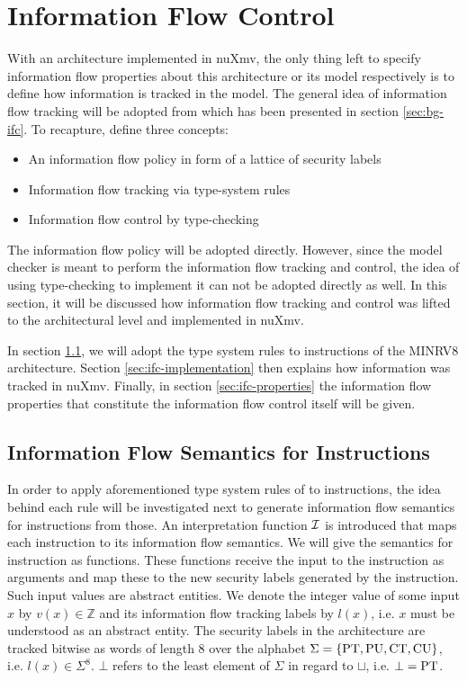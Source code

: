 
\chapter{Information Flow Control}
\label{chp:ifc}

With an architecture implemented in nuXmv, the only thing left to specify information flow properties about this architecture or its model respectively is to define how information is tracked in the model.
The general idea of information flow tracking will be adopted from \cite{Ferraiuolo17} which has been presented in section \ref{sec:bg-ifc}.
To recapture, \citeauthor{Ferraiuolo17} define three concepts:
\begin{itemize}
    \item An information flow policy in form of a lattice of security labels
    \item Information flow tracking via type-system rules
    \item Information flow control by type-checking
\end{itemize}

The information flow policy will be adopted directly.
However, since the model checker is meant to perform the information flow tracking and control, the idea of using type-checking to implement it can not be adopted directly as well.
In this section, it will be discussed how information flow tracking and control was lifted to the architectural level and implemented in nuXmv.

In section \ref{sec:ifc-model}, we will adopt the type system rules to instructions of the MINRV8 architecture.
Section \ref{sec:ifc-implementation} then explains how information was tracked in nuXmv.
Finally, in section \ref{sec:ifc-properties} the information flow properties that constitute the information flow control itself will be given.

\section{Information Flow Semantics for Instructions}
\label{sec:ifc-model}

In order to apply aforementioned type system rules of \cite{Ferraiuolo17} to instructions, the idea behind each rule will be investigated next to generate information flow semantics for instructions from those.
An interpretation function $ \mathcal{I} $ is introduced that maps each instruction to its information flow semantics.
We will give the semantics for instruction as functions.
These functions receive the input to the instruction as arguments and map these to the new security labels generated by the instruction.
Such input values are abstract entities.
We denote the integer value of some input $ x $ by $ v(x) \in \mathbb{Z} $ and its information flow tracking labels by $ l(x) $, i.e. $ x $ must be understood as an abstract entity.
The security labels in the architecture are tracked bitwise as words of length 8 over the alphabet $ \Sigma = \{ \text{PT}, \text{PU}, \text{CT}, \text{CU} \} $, i.e. $ l(x) \in \Sigma^8 $.
$ \bot $ refers to the least element of $ \Sigma $ in regard to $ \sqcup $, i.e. $ \bot = \text{PT} $.


